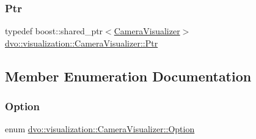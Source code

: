 \subsubsection{\texorpdfstring{Ptr}{Ptr}}
{\footnotesize\ttfamily typedef boost\+::shared\+\_\+ptr$<$\mbox{\hyperlink{classdvo_1_1visualization_1_1_camera_visualizer}{Camera\+Visualizer}}$>$ \mbox{\hyperlink{classdvo_1_1visualization_1_1_camera_visualizer_a473ebecc62e1d4edba21027d858789a2}{dvo\+::visualization\+::\+Camera\+Visualizer\+::\+Ptr}}}



\subsection{Member Enumeration Documentation}
\mbox{\label{classdvo_1_1visualization_1_1_camera_visualizer_a0526f50be9f298c4f7d1f91018d50af7}} 
\subsubsection{\texorpdfstring{Option}{Option}}
{\footnotesize\ttfamily enum \mbox{\hyperlink{classdvo_1_1visualization_1_1_camera_visualizer_a0526f50be9f298c4f7d1f91018d50af7}{dvo\+::visualization\+::\+Camera\+Visualizer\+::\+Option}}}

